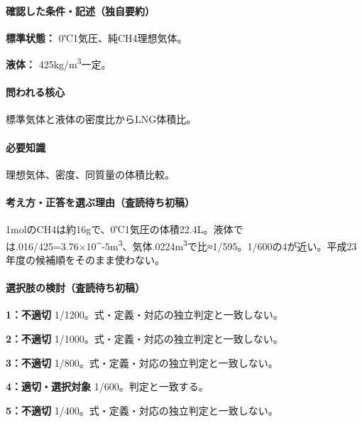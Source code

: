 \paragraph{確認した条件・記述（独自要約）}\mbox{}\par

\noindent\textbf{標準状態：} 0℃1気圧、純CH4理想気体。\par

\noindent\textbf{液体：} 425kg/m\textsuperscript{3}一定。\par

\paragraph{問われる核心} 標準気体と液体の密度比からLNG体積比。

\paragraph{必要知識} 理想気体、密度、同質量の体積比較。

\paragraph{考え方・正答を選ぶ理由（査読待ち初稿）} 1molのCH4は約16gで、0℃1気圧の体積22.4L。液体では.016/425=\allowbreak{}3.76×10\textasciicircum{}-5m\textsuperscript{3}、気体.0224m\textsuperscript{3}で比≈1/595。1/600の4が近い。平成23年度の候補順をそのまま使わない。

\paragraph{選択肢の検討（査読待ち初稿）}\mbox{}\par

\noindent\textbf{1：不適切} 1/1200。式・定義・対応の独立判定と一致しない。\par

\noindent\textbf{2：不適切} 1/1000。式・定義・対応の独立判定と一致しない。\par

\noindent\textbf{3：不適切} 1/800。式・定義・対応の独立判定と一致しない。\par

\noindent\textbf{4：適切・選択対象} 1/600。判定と一致する。\par

\noindent\textbf{5：不適切} 1/400。式・定義・対応の独立判定と一致しない。\par

